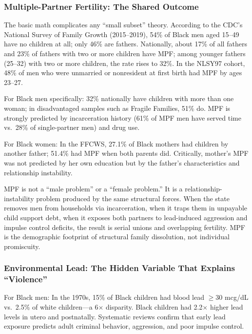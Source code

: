 \subsubsection{Multiple-Partner Fertility: The Shared Outcome}

The basic math complicates any ``small subset'' theory. According to the CDC's National Survey of Family Growth (2015--2019), 54\% of Black men aged 15--49 have no children at all; only 46\% are fathers. Nationally, about 17\% of all fathers and 23\% of fathers with two or more children have MPF; among younger fathers (25--32) with two or more children, the rate rises to 32\%. In the NLSY97 cohort, 48\% of men who were unmarried or nonresident at first birth had MPF by ages 23--27.

For Black men specifically: 32\% nationally have children with more than one woman; in disadvantaged samples such as Fragile Families, 51\% do. MPF is strongly predicted by incarceration history (61\% of MPF men have served time vs.~28\% of single-partner men) and drug use.

For Black women: In the FFCWS, 27.1\% of Black mothers had children by another father; 51.4\% had MPF when both parents did. Critically, mother's MPF was not predicted by her own education but by the father's characteristics and relationship instability.

MPF is not a ``male problem'' or a ``female problem.'' It is a relationship-instability problem produced by the same structural forces. When the state removes men from households via incarceration, when it traps them in unpayable child support debt, when it exposes both partners to lead-induced aggression and impulse control deficits, the result is serial unions and overlapping fertility. MPF is the demographic footprint of structural family dissolution, not individual promiscuity.

\subsubsection{Environmental Lead: The Hidden Variable That Explains ``Violence''}

For Black men: In the 1970s, 15\% of Black children had blood lead $\geq$30 mcg/dL vs.~2.5\% of white children---a 6$\times$ disparity. Black children had 2.2$\times$ higher lead levels in utero and postnatally. Systematic reviews confirm that early lead exposure predicts adult criminal behavior, aggression, and poor impulse control.

